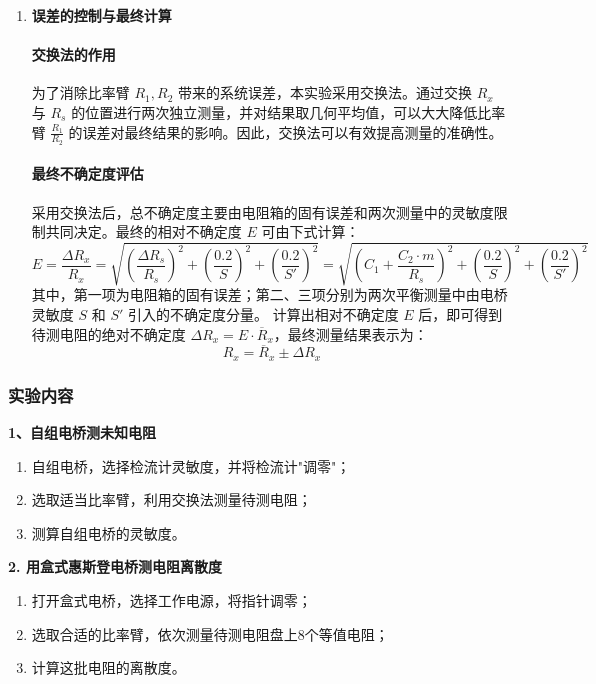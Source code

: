 \documentclass[]{../template/Report}%
\begin{document}
\begin{enumerate}[label=(\arabic*)]
\newpage
\item \textbf{误差的控制与最终计算}

    \paragraph{交换法的作用}
    为了消除比率臂 $R_1, R_2$ 带来的系统误差，本实验采用交换法。通过交换 $R_x$ 与 $R_s$ 的位置进行两次独立测量，并对结果取几何平均值，可以大大降低比率臂 $\frac{R_1}{R_2}$ 的误差对最终结果的影响。因此，交换法可以有效提高测量的准确性。

    \paragraph{最终不确定度评估}
    采用交换法后，总不确定度主要由电阻箱的固有误差和两次测量中的灵敏度限制共同决定。最终的相对不确定度 $E$ 可由下式计算：
    \begin{equation}
    E = \frac{\Delta R_x}{R_x} = \sqrt{\left(\frac{\Delta R_s}{R_s}\right)^2 + \left(\frac{0.2}{S}\right)^2 + \left(\frac{0.2}{S'}\right)^2}=\sqrt{\left(C_1 + \frac{C_2 \cdot m}{R_s}\right)^2 + \left(\frac{0.2}{S}\right)^2 + \left(\frac{0.2}{S'}\right)^2}
    \end{equation}
    其中，第一项为电阻箱的固有误差；第二、三项分别为两次平衡测量中由电桥灵敏度 $S$ 和 $S'$ 引入的不确定度分量。
    计算出相对不确定度 $E$ 后，即可得到待测电阻的绝对不确定度 $\Delta R_x = E \cdot \overline{R}_x$，最终测量结果表示为：
    \begin{equation}
    \boxed{R_x = \overline{R}_x \pm \Delta R_x}
    \end{equation}

\end{enumerate}

\subsubsection{实验内容}
\textbf{1、自组电桥测未知电阻}

\begin{enumerate}[label=\textbf{Step}\arabic*,leftmargin=6em]    
    \item 自组电桥，选择检流计灵敏度，并将检流计"调零"；
    \item 选取适当比率臂，利用交换法测量待测电阻；
    \item 测算自组电桥的灵敏度。
\end{enumerate}

\textbf{2. 用盒式惠斯登电桥测电阻离散度}
\begin{enumerate}[label=\textbf{Step}\arabic*,leftmargin=6em]
    \item 打开盒式电桥，选择工作电源，将指针调零；
    \item 选取合适的比率臂，依次测量待测电阻盘上8个等值电阻；
    \item 计算这批电阻的离散度。
\end{enumerate}
\end{document}

